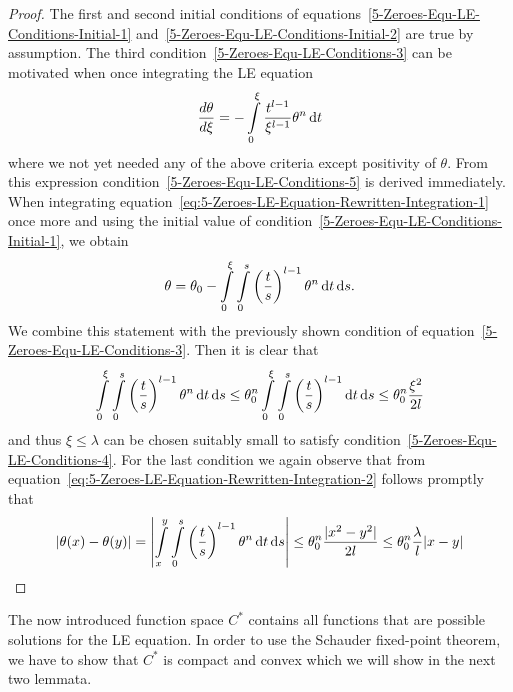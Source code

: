 \begin{proof}
	The first and second initial conditions of equations~\eqref{5-Zeroes-Equ-LE-Conditions-Initial-1} and~\eqref{5-Zeroes-Equ-LE-Conditions-Initial-2} are true by assumption.
	The third condition~\eqref{5-Zeroes-Equ-LE-Conditions-3} can be motivated when once integrating the \ac{LE} equation
	\begin{equation}
		\frac{d\theta}{d\xi} = -\int\limits_0^\xi \frac{t^{l-1}}{\xi^{l-1}}\theta^n \mathop{}\!\mathrm{d} t
		\label{eq:5-Zeroes-LE-Equation-Rewritten-Integration-1}
	\end{equation}
	where we not yet needed any of the above criteria except positivity of $\theta$.
	From this expression condition~\eqref{5-Zeroes-Equ-LE-Conditions-5} is derived immediately.
	When integrating equation~\eqref{eq:5-Zeroes-LE-Equation-Rewritten-Integration-1} once more and using the initial value of condition~\eqref{5-Zeroes-Equ-LE-Conditions-Initial-1}, we obtain
	\begin{equation}
		\theta = \theta_0 -\int\limits_0^\xi\int\limits_0^s \left(\frac{t}{s}\right)^{l-1}\theta^n \mathop{}\!\mathrm{d} t \mathop{}\!\mathrm{d} s.
		\label{eq:5-Zeroes-LE-Equation-Rewritten-Integration-2}
	\end{equation}
	We combine this statement with the previously shown condition of equation~\eqref{5-Zeroes-Equ-LE-Conditions-3}.
	Then it is clear that
	\begin{equation}
		\int\limits_0^\xi\int\limits_0^s \left(\frac{t}{s}\right)^{l-1}\theta^n \mathop{}\!\mathrm{d} t \mathop{}\!\mathrm{d} s \leq \theta_0^n\int\limits_0^\xi\int\limits_0^s \left(\frac{t}{s}\right)^{l-1} \mathop{}\!\mathrm{d} t \mathop{}\!\mathrm{d} s \leq \theta_0^n\frac{\xi^2}{2l}
		\label{eq:5-Zeroes-LE-Equation-Rewritten-Inequality}
	\end{equation}
	and thus $\xi\leq\lambda$ can be chosen suitably small to satisfy condition~\eqref{5-Zeroes-Equ-LE-Conditions-4}.
	For the last condition we again observe that from equation~\eqref{eq:5-Zeroes-LE-Equation-Rewritten-Integration-2} follows promptly that
	\begin{equation}
		|\theta(x)-\theta(y)| = \left|\int\limits_x^y\int\limits_0^s \left(\frac{t}{s}\right)^{l-1}\theta^n \mathop{}\!\mathrm{d} t \mathop{}\!\mathrm{d} s\right| \leq \theta^n_0\frac{|x^2-y^2|}{2l} \leq \theta^n_0\frac{\lambda}{l}|x-y|
		\label{eq:5-Zeroes-LE-Equation-Rewritten-Inequality-2}
	\end{equation}
\end{proof}\noindent
The now introduced function space $C^*$ contains all functions that are possible solutions for the \ac{LE} equation.
In order to use the Schauder fixed-point theorem, we have to show that $C^*$ is compact and convex which we will show in the next two lemmata.

